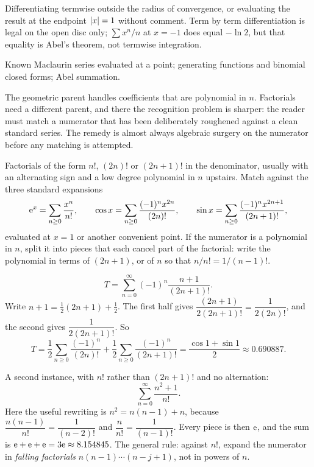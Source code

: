 \begin{trap}
Differentiating termwise outside the radius of convergence, or evaluating the result at the endpoint $\left\lvert x\right\rvert=1$ without comment. Term by term differentiation is legal on the open disc only; $\sum x^{n}/n$ at $x=-1$ does equal $-\ln2$, but that equality is Abel's theorem, not termwise integration.
\end{trap}

\begin{seealsob}Known Maclaurin series evaluated at a point; generating functions and binomial closed forms; Abel summation.\end{seealsob}

The geometric parent handles coefficients that are polynomial in $n$. Factorials need a different parent, and there the recognition problem is sharper: the reader must match a numerator that has been deliberately roughened against a clean standard series. The remedy is almost always algebraic surgery on the numerator before any matching is attempted.

\cue Factorials of the form $n!$, $(2n)!$ or $(2n+1)!$ in the denominator, usually with an alternating sign and a low degree polynomial in $n$ upstairs.
\method Match against the three standard expansions
\[\mathrm{e}^{x}=\sum_{n\geq0}\frac{x^{n}}{n!},\qquad \cos x=\sum_{n\geq0}\frac{(-1)^{n}x^{2n}}{(2n)!},\qquad \sin x=\sum_{n\geq0}\frac{(-1)^{n}x^{2n+1}}{(2n+1)!},\]
evaluated at $x=1$ or another convenient point. If the numerator is a polynomial in $n$, split it into pieces that each cancel part of the factorial: write the polynomial in terms of $(2n+1)$, or of $n$ so that $n/n!=1/(n-1)!$.

\begin{worked}
\[T=\sum_{n=0}^{\infty}(-1)^{n}\frac{n+1}{(2n+1)!}.\]
Write $n+1=\tfrac12(2n+1)+\tfrac12$. The first half gives $\dfrac{(2n+1)}{2(2n+1)!}=\dfrac{1}{2(2n)!}$, and the second gives $\dfrac{1}{2(2n+1)!}$. So
\[T=\frac12\sum_{n\geq0}\frac{(-1)^{n}}{(2n)!}+\frac12\sum_{n\geq0}\frac{(-1)^{n}}{(2n+1)!}=\frac{\cos1+\sin1}{2}\approx0.690887.\]
\end{worked}
A second instance, with $n!$ rather than $(2n+1)!$ and no alternation:
\[\sum_{n=0}^{\infty}\frac{n^{2}+1}{n!}.\]
Here the useful rewriting is $n^{2}=n(n-1)+n$, because $\dfrac{n(n-1)}{n!}=\dfrac{1}{(n-2)!}$ and $\dfrac{n}{n!}=\dfrac{1}{(n-1)!}$. Every piece is then $\mathrm{e}$, and the sum is $\mathrm{e}+\mathrm{e}+\mathrm{e}=3\mathrm{e}\approx8.154845$. The general rule: against $n!$, expand the numerator in \emph{falling factorials} $n(n-1)\cdots(n-j+1)$, not in powers of $n$.

